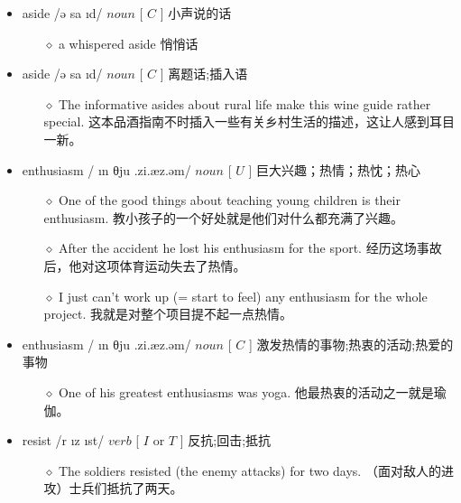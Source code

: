 \documentclass[a4paper,top=2.5cm,buttom=2.5cm10.5pt]{book}
\begin{document}
\begin{itemize}
\item aside /ə \textprimstress sa \i d/ $ noun $ [  $ C $  ] 小声说的话
\begin{itemize}
\item[$\diamond$] a whispered aside
悄悄话
\end{itemize}
\end{itemize}
\begin{itemize}
\item aside /ə \textprimstress sa \i d/ $ noun $ [  $ C $  ] 离题话;插入语
\begin{itemize}
\item[$\diamond$] The informative asides about rural life make this wine guide rather special.
这本品酒指南不时插入一些有关乡村生活的描述，这让人感到耳目一新。
\end{itemize}
\end{itemize}
\begin{itemize}
\item enthusiasm / \i n \textprimstress θju \textlengthmark .zi.æz.əm/ $ noun $ [  $ U $  ] 巨大兴趣；热情；热忱；热心
\begin{itemize}
\item[$\diamond$] One of the good things about teaching young children is their enthusiasm.
教小孩子的一个好处就是他们对什么都充满了兴趣。
\item[$\diamond$] After the accident he lost his enthusiasm for the sport.
经历这场事故后，他对这项体育运动失去了热情。
\item[$\diamond$] I just can't work up (= start to feel) any enthusiasm for the whole project.
我就是对整个项目提不起一点热情。
\end{itemize}
\end{itemize}
\begin{itemize}
\item enthusiasm / \i n \textprimstress θju \textlengthmark .zi.æz.əm/ $ noun $ [  $ C $  ] 激发热情的事物;热衷的活动;热爱的事物
\begin{itemize}
\item[$\diamond$] One of his greatest enthusiasms was yoga.
他最热衷的活动之一就是瑜伽。
\end{itemize}
\end{itemize}
\begin{itemize}
\item resist /r \i  \textprimstress z \i st/ $ verb $ [  $ I $  or  $ T $  ] 反抗;回击;抵抗
\begin{itemize}
\item[$\diamond$] The soldiers resisted (the enemy attacks) for two days.
（面对敌人的进攻）士兵们抵抗了两天。
\end{itemize}
\end{itemize}
\end{document}
